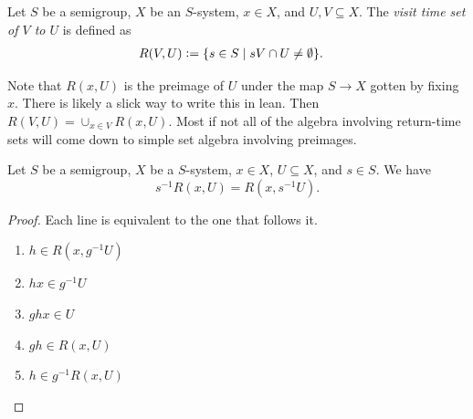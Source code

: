 \begin{definition}
\label{def_set_visit_time_set}
\leanok{}
    Let $S$ be a semigroup, $X$ be an $S$-system, $x \in X$, and $U, V \subseteq X$.  The \emph{visit time set of $V$ to $U$} is defined as
    \begin{align*}
        R(V,U) &\vcentcolon= \{s \in S \mid sV \cap U \neq \emptyset\}.
    \end{align*}
\end{definition}

\begin{leanrmk}
    Note that $R(x,U)$ is the preimage of $U$ under the map $S \to X$ gotten by fixing $x$.  There is likely a slick way to write this in lean.  Then $R(V,U) = \cup_{x \in V} R(x,U)$.  Most if not all of the algebra involving return-time sets will come down to simple set algebra involving preimages.
\end{leanrmk}

\begin{lemma}
\label{lemma_return_time_algebra_one}
\leanok{}
    Let $S$ be a semigroup, $X$ be a $S$-system, $x \in X$, $U \subseteq X$, and $s \in S$. We have
    \[s^{-1}R(x,U) = R(x,s^{-1}U).\]
\end{lemma}

\begin{proof}
\leanok{}
    Each line is equivalent to the one that follows it.
    \begin{enumerate}
        \item $h \in R(x,g^{-1}U)$
        \item $hx \in g^{-1}U$
        \item $ghx \in U$
        \item $gh \in R(x,U)$
        \item $h \in g^{-1} R(x,U)$
    \end{enumerate}
\end{proof}



